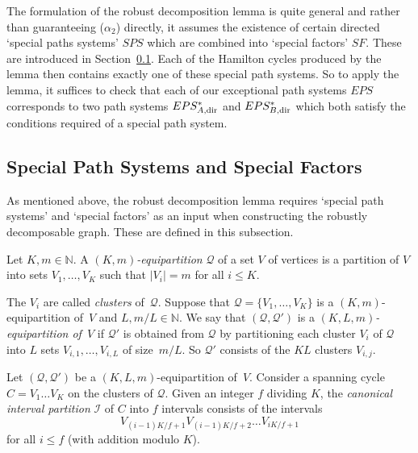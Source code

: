 \documentclass{memo-l}
\def\COMMENT#1{}
\def\eps{\varepsilon}
\def\epszero{\eps_0}
\numberwithin{section}{chapter}
\numberwithin{equation}{section}
\numberwithin{firstthm}{section}
\numberwithin{figure}{section}
\begin{document}
The formulation of the robust decomposition lemma is quite general and rather than guaranteeing ($\alpha_2$) directly,
it assumes the existence of certain directed `special paths systems' $SPS$ which are combined into `special factors' $SF$.
These are introduced in Section~\ref{sec:SF}. Each of the Hamilton cycles produced by the lemma then contains
exactly one of these special path systems. So to apply the lemma, it suffices to check that each of our
exceptional path systems $EPS$ corresponds to two path systems $EPS^*_{A,\rm dir}$ and $EPS^*_{B,\rm dir}$
which both satisfy the conditions required of a special path system.



\subsection{Special Path Systems and Special Factors}\label{sec:SF}
As mentioned above, the robust decomposition lemma requires `special path systems' and `special factors' as an input when constructing 
the robustly decomposable graph.
These are defined in this subsection.

Let $K,m \in \mathbb{N}$.
A \emph{$(K,m)$-equipartition} $\mathcal{Q}$ of a set $V$ of vertices is a partition of $V$ into sets $V_1, \dots, V_K$ such that $|V_i| = m$ for all $i \le K$.%
         \COMMENT{Note that there is no exceptional vertex set. Observe that $\mathcal{Q}_A:= \{A_1, \dots, A_K\}$ is a $(K,m)$-partition of $A$.
I added `equi' to increase the differences between $(K,m)$-equipartition to $(K,m, \epszero)$-partition.}
The $V_i$ are called \emph{clusters} of~$\mathcal{Q}$.
Suppose that $\mathcal{Q}=\{V_1,\dots,V_K\}$ is a $(K,m)$-equipartition of~$V$ and $L,m/L\in\mathbb{N}$.
We say that $(\mathcal{Q},\mathcal{Q'})$ is a \emph{$(K, L, m)$-equipartition of~$V$} if $\mathcal{Q'}$ is 
obtained from $\mathcal{Q}$ by partitioning each cluster $V_i$ of $\mathcal{Q}$
into $L$ sets $V_{i,1},\dots,V_{i,L}$ of size~$m/L$.
So $\mathcal{Q}'$ consists of the $KL$ clusters $V_{i,j}$.

Let $(\mathcal{Q},\mathcal{Q'})$ be a $(K,L,m)$-equipartition of~$V$.
Consider a spanning cycle $C = V_1 \dots V_K$ on the clusters of $\mathcal{Q}$.
Given an integer $f$ dividing $K$, the \emph{canonical interval partition} $\mathcal{I}$ of $C$ into $f$ intervals
consists of the intervals $$V_{(i-1)K/f+1}  V_{(i-1)K/f+2} \dots V_{iK/f+1}$$ for all $i\le f$ (with
addition modulo $K$).
\end{document}
